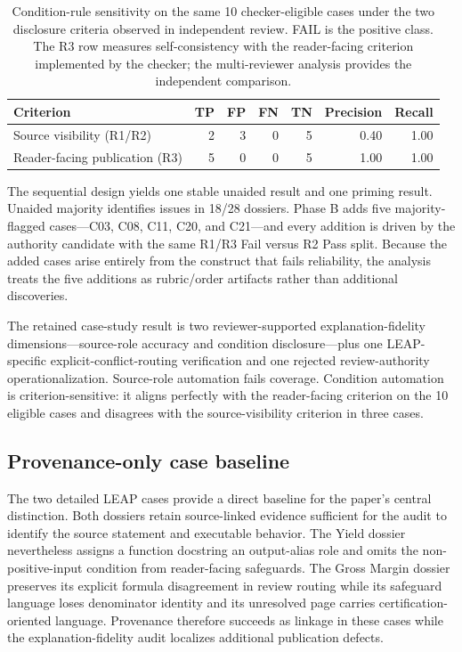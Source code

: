 \documentclass[a4paper,fleqn]{cas-dc}
\begin{document}
\begin{table}[t]
\centering
\caption{Condition-rule sensitivity on the same 10 checker-eligible cases under the two disclosure criteria observed in independent review. FAIL is the positive class. The R3 row measures self-consistency with the reader-facing criterion implemented by the checker; the multi-reviewer analysis provides the independent comparison.}
\label{tab:condition_criteria}
\begin{tabularx}{\textwidth}{@{}Xrrrrrr@{}}
\toprule
Criterion & TP & FP & FN & TN & Precision & Recall \\
\midrule
Source visibility (R1/R2) & 2 & 3 & 0 & 5 & 0.40 & 1.00 \\
Reader-facing publication (R3) & 5 & 0 & 0 & 5 & 1.00 & 1.00 \\
\bottomrule
\end{tabularx}
\end{table}

The sequential design yields one stable unaided result and one priming result. Unaided majority identifies issues in 18/28 dossiers. Phase B adds five majority-flagged cases---C03, C08, C11, C20, and C21---and every addition is driven by the authority candidate with the same R1/R3 Fail versus R2 Pass split. Because the added cases arise entirely from the construct that fails reliability, the analysis treats the five additions as rubric/order artifacts rather than additional discoveries.

The retained case-study result is two reviewer-supported explanation-fidelity dimensions---source-role accuracy and condition disclosure---plus one LEAP-specific explicit-conflict-routing verification and one rejected review-authority operationalization. Source-role automation fails coverage. Condition automation is criterion-sensitive: it aligns perfectly with the reader-facing criterion on the 10 eligible cases and disagrees with the source-visibility criterion in three cases.

\subsection{Provenance-only case baseline}
The two detailed LEAP cases provide a direct baseline for the paper's central distinction. Both dossiers retain source-linked evidence sufficient for the audit to identify the source statement and executable behavior. The Yield dossier nevertheless assigns a function docstring an output-alias role and omits the non-positive-input condition from reader-facing safeguards. The Gross Margin dossier preserves its explicit formula disagreement in review routing while its safeguard language loses denominator identity and its unresolved page carries certification-oriented language. Provenance therefore succeeds as linkage in these cases while the explanation-fidelity audit localizes additional publication defects.
\end{document}
